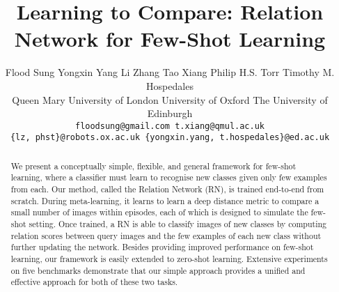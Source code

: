 \documentclass[10pt,twocolumn,letterpaper]{article}
\begin{document}
\title{Learning to Compare: Relation Network for Few-Shot Learning}

\author{Flood Sung \quad Yongxin Yang  \quad Li Zhang \quad  Tao Xiang \quad   Philip H.S. Torr  \quad  Timothy M. Hospedales\\
Queen Mary University of London \quad University of Oxford \quad The University of Edinburgh\\
{\tt\small floodsung@gmail.com \quad t.xiang@qmul.ac.uk} \\ 
{\tt\small \{lz, phst\}@robots.ox.ac.uk \quad \{yongxin.yang, t.hospedales\}@ed.ac.uk}
}

\maketitle
\thispagestyle{empty}

\begin{abstract}

We present a conceptually simple, flexible, and general framework for few-shot learning, where a classifier must learn to recognise new classes given only few examples from each. Our method, called the Relation Network (RN), is trained end-to-end from scratch. During meta-learning, it learns to learn a deep distance metric to compare a small number of images within episodes, each of which is designed to simulate the few-shot setting. 
Once trained, a RN is able to classify images of new classes by computing relation scores between query images and the few examples of each new class without further updating the network. 
Besides providing improved performance on few-shot learning, our framework is easily extended to zero-shot learning. Extensive experiments on five benchmarks demonstrate that our simple approach provides a unified and effective approach for both of these two tasks. 
\end{abstract}
\end{document}
